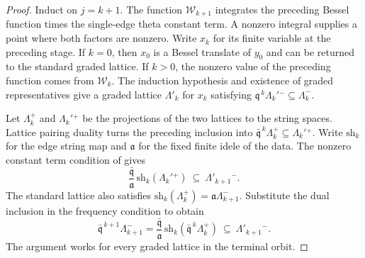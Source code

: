 \begin{proof}
Induct on $j=k+1$. The function $\mathcal W_{k+1}$ integrates the preceding Bessel function times the single-edge theta constant term. A nonzero integral supplies a point where both factors are nonzero. Write $x_k$ for its finite variable at the preceding stage. If $k=0$, then $x_0$ is a Bessel translate of $y_0$ and can be returned to the standard graded lattice. If $k>0$, the nonzero value of the preceding function comes from $\mathcal W_k$. The induction hypothesis and existence of graded representatives give a graded lattice $\Lambda'_k$ for $x_k$ satisfying $\mathfrak q^{\,k}\Lambda_k'{}^{-}\subseteq\Lambda_k^{-}$.

Let $\Lambda_k^+$ and $\Lambda_k'{}^+$ be the projections of the two lattices to the string spaces. Lattice pairing duality turns the preceding inclusion into $\bar{\mathfrak q}^{\,k}\Lambda_k^+\subseteq\Lambda_k'{}^+$. Write $\mathrm{sh}_k$ for the edge string map and $\mathfrak a$ for the fixed finite idele of the data. The nonzero constant term condition of  gives
\[
 \frac{\bar{\mathfrak q}}{\mathfrak a}\,
       \mathrm{sh}_k(\Lambda_k'{}^+)\ \subseteq\ \Lambda'_{k+1}{}^{-}.
\]
The standard lattice also satisfies $\mathrm{sh}_k(\Lambda_k^+)=\mathfrak a\Lambda_{k+1}^{-}$. Substitute the dual inclusion in the frequency condition to obtain
\[
 \bar{\mathfrak q}^{\,k+1}\Lambda_{k+1}^{-}
   =\frac{\bar{\mathfrak q}}{\mathfrak a}\,
           \mathrm{sh}_k(\bar{\mathfrak q}^{\,k}\Lambda_k^+)
   \ \subseteq\ \Lambda'_{k+1}{}^{-}.
\]
The argument works for every graded lattice in the terminal orbit.


\end{proof}
